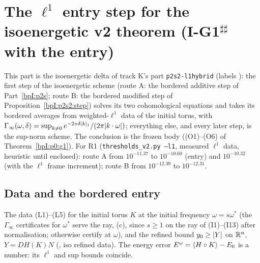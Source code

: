 \sloppy
\section{The $\ell^1$ entry step for the isoenergetic v2 theorem (I-G1$^{\sharp\sharp}$ with the entry)}\label{bpI:p2s2l1}

This part is the isoenergetic delta of track K's part \texttt{p2s2-l1hybrid} (labels ): the first step of the isoenergetic
scheme (route A: the bordered additive step of Part~\ref{bpI:p2s}; route B: the bordered modified step of Proposition~\ref{bpI:p2s2:step}) solves
its two cohomological equations and takes its bordered averages from weighted-$\ell^1$ data of the initial torus, with
$\Gamma_\infty(\omega,\delta)=\sup_{k\ne0}e^{-2\pi\delta\lvert k\rvert_1}/(2\pi\lvert k\cdot\omega\rvert)$; everything else, and every later step, is the sup-norm scheme. The
conclusion is the frozen body  ((O1)--(O6) of Theorem~\ref{bpI:p0:g1}). For R1 (\texttt{thresholds\_v2.py --l1}, measured $\ell^1$ data,
heuristic until enclosed): route A from $10^{-11.37}$ to $10^{-10.60}$ (entry) and $10^{-10.32}$ (with the $\ell^1$ frame increment); route B from
$10^{-12.39}$ to $10^{-12.31}$.

\subsection{Data and the bordered entry}\label{bpI:p2s2l1:sec-step}

\begin{assumption}\label{bpI:p2s2l1:data}
The data  (L1)--(L5) for the initial torus $K$ at the initial frequency $\omega=s\omega^*$ (the $\Gamma_\infty$ certificates for $\omega^*$ serve
the ray, (c), since $s\ge1$ on the ray of (I1)--(I13) after normalisation; otherwise certify at $\omega$), and the refined bound
$y_0\ge\lvert Y\rvert$ on $\mathbb{R}^n$, $Y=DH(K)N$ (, iso refined data). The energy error $E^\omega=\langle H\circ K\rangle-E_0$ is a number: its $\ell^1$ and sup
bounds coincide.
\end{assumption}

